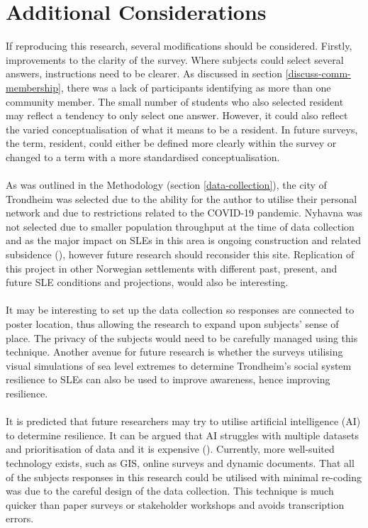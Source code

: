 \section{Additional Considerations}
If reproducing this research, several modifications should be considered. Firstly, improvements to the clarity of the survey. Where subjects could select several answers, instructions need to be clearer. As discussed in section \ref{discuss-comm-membership}, there was a lack of participants identifying as more than one community member. The small number of students who also selected resident may reflect a tendency to only select one answer. However, it could also reflect the varied conceptualisation of what it means to be a resident. In future surveys, the term, resident, could either be defined more clearly within the survey or changed to a term with a more standardised conceptualisation.  
\paragraph{}
As was outlined in the Methodology (section \ref{data-collection}), the city of Trondheim was selected due to the ability for the author to utilise their personal network and due to restrictions related to the COVID-19 pandemic.  Nyhavna was not selected due to smaller population throughput at the time of data collection and as the major impact on SLEs in this area is ongoing construction and related subsidence (\cite{miljoenheten_og_byplankontoret_trondheim_kommune_9-notat-om-havnivastigning-og-stormflo---hensyn-i-arealplanlegging-nyhavnapdf_2020}), however future research should reconsider this site. Replication of this project in other Norwegian settlements with different past, present, and future SLE conditions and projections, would also be interesting. 

\paragraph{}
It may be interesting to set up the data collection so responses are connected to poster location, thus allowing the research to expand upon subjects' sense of place. The privacy of the subjects would need to be carefully managed using this technique. Another avenue for future research is whether the surveys utilising visual simulations of sea level extremes to determine Trondheim's social system resilience to SLEs can also be used to improve awareness, hence improving resilience. 
\paragraph{}
It is predicted that future researchers may try to utilise artificial intelligence (AI) to determine resilience. It can be argued that AI struggles with multiple datasets and prioritisation of data and it is expensive (\cite{shane_you_2019}). Currently, more well-suited technology exists, such as GIS, online surveys and dynamic documents. That all of the subjects responses in this research could be utilised with minimal re-coding was due to the careful design of the data collection. This technique is much quicker than paper surveys or stakeholder workshops and avoids transcription errors.
